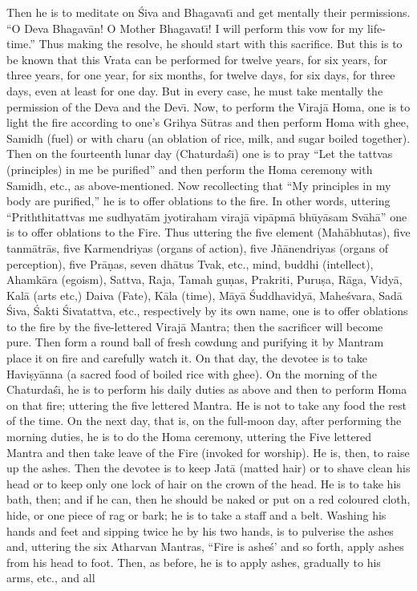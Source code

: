 Then he is to meditate on \'Siva and Bhagavat\={\i} and get mentally their permissions. ``O Deva Bhagav\=an! O Mother Bhagavat\={\i}! I will perform this vow for my life-time.'' Thus making the resolve, he should start with this sacrifice. But this is to be known that this Vrata can be performed for twelve years, for six years, for three years, for one year, for six months, for twelve days, for six days, for three days, even at least for one day. But in every case, he must take mentally the permission of the Deva and the Dev\={\i}. Now, to perform the Viraj\=a Homa, one is to light the fire according to one's Grihya S\=utras and then perform Homa with ghee, Samidh (fuel) or with charu (an oblation of rice, milk, and sugar boiled together). Then on the fourteenth lunar day (Chaturda\'s\={\i}) one is to pray ``Let the tattvas (principles) in me be purified'' and then perform the Homa ceremony with Samidh, etc., as above-mentioned. Now recollecting that ``My principles in my body are purified,'' he is to offer oblations to the fire. In other words, uttering ``Priththitattvas me sudhyat\=am jyotiraham viraj\=a vip\=apm\=a bh\=uy\=asam Sv\=ah\=a'' one is to offer oblations to the Fire. Thus uttering the five element (Mah\=abhutas), five tanm\=atr\=as, five Karmendriyas (organs of action), five J\~n\=anendriyas (organs of perception), five Pr\=a\d{n}as, seven dh\=atus Tvak, etc., mind, buddhi (intellect), Ahamk\=ara (egoism), Sattva, Raja, Tamah gu\d{n}as, Prakriti, Puru\d{s}a, R\=aga, Vidy\=a, Kal\=a (arts etc,) Daiva (Fate), K\=ala (time), M\=ay\=a \'Suddhavidy\=a, Mahe\'svara, Sad\=a \'Siva, \'Sakti \'Sivatattva, etc., respectively by its own name, one is to offer oblations to the fire by the five-lettered Viraj\=a Mantra; then the sacrificer will become pure. Then form a round ball of fresh cowdung and purifying it by Mantram place it on fire and carefully watch it. On that day, the devotee is to take Havi\d{s}y\=anna (a sacred food of boiled rice with ghee). On the morning of the Chaturda\'s\={\i}, he is to perform his daily duties as above and then to perform Homa on that fire; uttering the five lettered Mantra. He is not to take any food the rest of the time. On the next day, that is, on the full-moon day, after performing the morning duties, he is to do the Homa ceremony, uttering the Five lettered Mantra and then take leave of the Fire (invoked for worship). He is, then, to raise up the ashes. Then the devotee is to keep Jat\=a (matted hair) or to shave clean his head or to keep only one lock of hair on the crown of the head. He is to take his bath, then; and if he can, then he should be naked or put on a red coloured cloth, hide, or one piece of rag or bark; he is to take a staff and a belt. Washing his hands and feet and sipping twice he by his two hands, is to pulverise the ashes and, uttering the six Atharvan Mantras, ``Fire is ashe\'s' and so forth, apply ashes from his head to foot. Then, as before, he is to apply ashes, gradually to his arms, etc., and all

